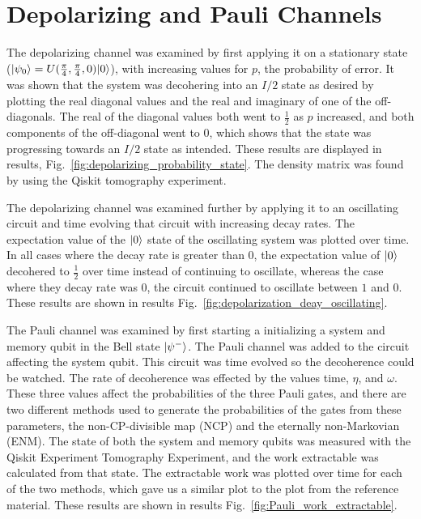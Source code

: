 \documentclass[12pt]{article}
\DeclarePairedDelimiter{\ket}{\lvert}{\rangle}
\begin{document}
  \section{Depolarizing and Pauli Channels}

  The depolarizing channel was examined by first applying it on a stationary state (\( \ket{\psi_{0}} = U(\frac{\pi}{4}, \frac{\pi}{4}, 0) \ket{0} \)), with increasing values for \( p \), the probability of error. It was shown that the system was decohering into an \( I / 2 \) state as desired by plotting the real diagonal values and the real and imaginary of one of the off-diagonals. The real of the diagonal values both went to \( \frac{1}{2} \) as \( p \) increased, and both components of the off-diagonal went to \( 0 \), which shows that the state was progressing towards an \( I / 2 \) state as intended. These results are displayed in results, Fig.~\ref{fig:depolarizing_probability_state}. The density matrix was found by using the Qiskit tomography experiment.

  The depolarizing channel was examined further by applying it to an oscillating circuit and time evolving that circuit with increasing decay rates. The expectation value of the \( \ket{0} \) state of the oscillating system was plotted over time. In all cases where the decay rate is greater than \( 0 \), the expectation value of \( \ket{0} \) decohered to \( \frac{1}{2} \) over time instead of continuing to oscillate, whereas the case where they decay rate was \( 0 \), the circuit continued to oscillate between \( 1 \) and \( 0 \). These results are shown in results Fig.~\ref{fig:depolarization_deay_oscillating}.

  The Pauli channel was examined by first starting a initializing a system and memory qubit in the Bell state \( \ket{\psi^{-}} \). The Pauli channel was added to the circuit affecting the system qubit. This circuit was time evolved so the decoherence could be watched. The rate of decoherence was effected by the values time, \( \eta \), and \( \omega \). These three values affect the probabilities of the three Pauli gates, and there are two different methods used to generate the probabilities of the gates from these parameters, the non-CP-divisible map (NCP) and the eternally non-Markovian (ENM). The state of both the system and memory qubits was measured with the Qiskit Experiment Tomography Experiment, and the work extractable was calculated from that state. The extractable work was plotted over time for each of the two methods, which gave us a similar plot to the plot from the reference material. These results are shown in results Fig.~\ref{fig:Pauli_work_extractable}.
\end{document}
